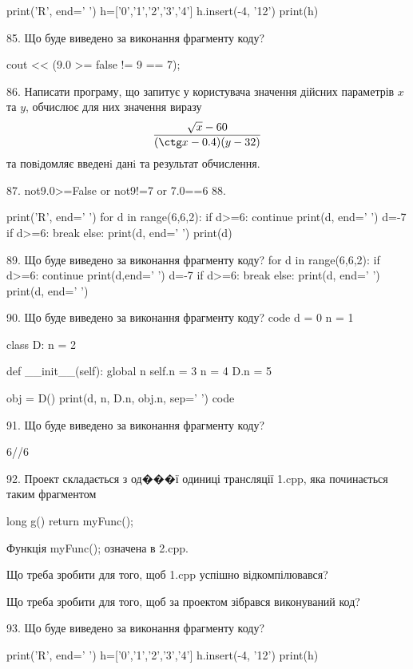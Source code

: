 \documentclass[11pt]{article}
\begin{document}
print('R', end=' ')
h=['0','1','2','3','4']
h.insert(-4, '12')
print(h)


85. Що буде виведено за виконання фрагменту коду?

cout << (9.0 >= false != 9 == 7);

86. 
Написати програму, що запитує у користувача значення дійсних параметрів $x$ та $y$, обчислює для них значення виразу 
$$\frac{\sqrt x - 60}{(\ctg x - 0.4) (y - 32)}$$ 
та повiдомляє введенi данi та результат обчислення.


87. 
not9.0>=False or not9!=7 or 7.0==6
88. 

print('R', end=' ')
for d in range(6,6,2):
    if d>=6:
        continue
        print(d, end=' ')
        d=-7
    if d>=6:
        break
    else:
        print(d, end=' ')
    print(d)

89. Що буде виведено за виконання фрагменту коду?
for d in range(6,6,2):
    if d>=6:
        continue
        print(d,end=' ')
        d=-7
    if d>=6:
        break
else:
    print(d, end=' ')
print(d, end=' ')

90. Що буде виведено за виконання фрагменту коду?
code
d = 0
n = 1

class D:
    n = 2
    
    def __init__(self):
global n        self.n = 3
        n = 4
        D.n = 5

obj = D()
print(d, n, D.n, obj.n, sep=' ')
code

91. Що буде виведено за виконання фрагменту коду?

6//6%

92. 
Проект складається з од���ї одиниці трансляції 1.cpp, яка починається таким фрагментом\par
long g(){ return myFunc();}\par
Функція myFunc(); означена в 2.cpp.\par
Що треба зробити для того, щоб 1.cpp успішно відкомпілювався?\par\vspace{1.5cm}
Що треба зробити для того, щоб за проектом зібрався виконуваний код?\par

93. Що буде виведено за виконання фрагменту коду?

print('R', end=' ')
h=['0','1','2','3','4']
h.insert(-4, '12')
print(h)
\end{document}
